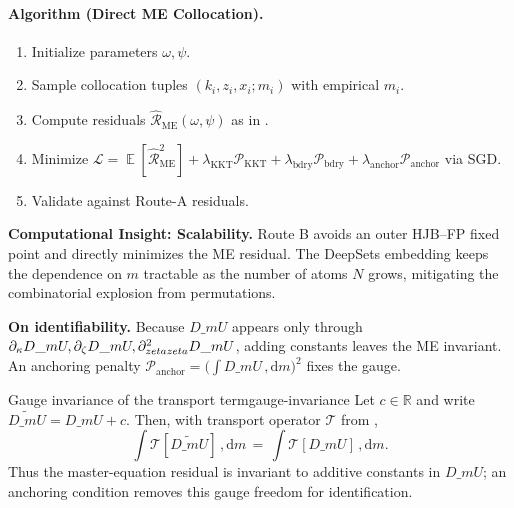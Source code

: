 ﻿\documentclass[11pt,letterpaper,oneside]{article}
\numberwithin{equation}{section}
\DeclareMathOperator{\E}{\mathbb{E}}
\newcommand{\R}{\mathbb{R}}
\newcommand{\1}{\mathbf{1}}
\newcommand{\diff}{,\mathrm{d}}
\newcommand{\dmU}{D\_m U}
\begin{document}
\begin{tcolorbox}[didacticstyle]
\begin{itemize}[leftmargin=1.1em,itemsep=0.25em]
\paragraph{Algorithm (Direct ME Collocation).}
\begin{enumerate}[leftmargin=1.5em,label=\textbf{B.\arabic*}]
\item Initialize parameters $\omega,\psi$.
\item Sample collocation tuples $(k_i,z_i,x_i; m_i)$ with empirical $m_i$.
\item Compute residuals $\widehat{\mathcal{R}}_{\mathrm{ME}}(\omega,\psi)$ as in .
\item Minimize $\mathcal{L}=\E[\widehat{\mathcal{R}}_{\mathrm{ME}}^2]+\lambda_{\mathrm{KKT}}\mathcal{P}_{\mathrm{KKT}}+\lambda_{\mathrm{bdry}}\mathcal{P}_{\mathrm{bdry}}+\lambda_{\mathrm{anchor}}\mathcal{P}_{\mathrm{anchor}}$ via SGD.
\item Validate against Route-A residuals.
\end{enumerate}

\begin{tcolorbox}[mathstyle]
\textbf{Computational Insight: Scalability.} Route B avoids an outer HJB--FP fixed point and directly minimizes the ME residual. The DeepSets embedding keeps the dependence on $m$ tractable as the number of atoms $N$ grows, mitigating the combinatorial explosion from permutations.
\end{tcolorbox}

\begin{tcolorbox}[mathstyle]
\textbf{On identifiability.} Because $\dmU$ appears only through $\partial_\kappa\dmU, \partial_\zeta\dmU, \partial_{\\zeta\\zeta}^2\dmU$, adding constants leaves the ME invariant. An anchoring penalty $\mathcal{P}_{\mathrm{anchor}}=\big(\int \dmU\,\diff m\big)^2$ fixes the gauge.
\end{tcolorbox}

\begin{lemma}{Gauge invariance of the transport term}{gauge-invariance}
Let $c\in\R$ and write $\widetilde{\dmU}=\dmU + c$. Then, with transport operator $\mathcal T$ from ,
\[
\int \mathcal T[\widetilde{\dmU}]\,\diff m \,=\, \int \mathcal T[\dmU] \,\diff m.
\]
Thus the master-equation residual is invariant to additive constants in $\dmU$; an anchoring condition removes this gauge freedom for identification.
\end{lemma}


\end{itemize}
\end{tcolorbox}
\end{document}
